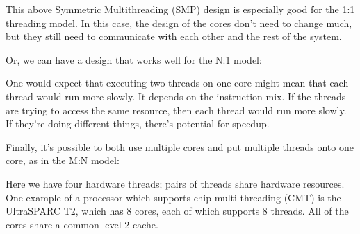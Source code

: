 This above Symmetric Multithreading (SMP) design is especially good for the 1:1 threading model. In
this case, the design of the cores don't need to change much, but they
still need to communicate with each other and the rest of the system.

Or, we can have a design that works well for the N:1 model:
\begin{center}
\end{center}

One would expect that executing two threads on one core might
mean that each thread would run more slowly. It depends on the instruction
mix. If the threads are trying to access the same resource, then each
thread would run more slowly. If they're doing different things, there's 
potential for speedup.

Finally, it's possible to both use multiple cores and put multiple threads
onto one core, as in the M:N model:

\begin{center}
\end{center}
Here we have four hardware threads; pairs of threads share hardware
resources. One example of a processor which supports chip multi-threading
(CMT) is the UltraSPARC T2, which has 8 cores, each of which supports 8 
threads. All of the cores share a common level 2 cache.

